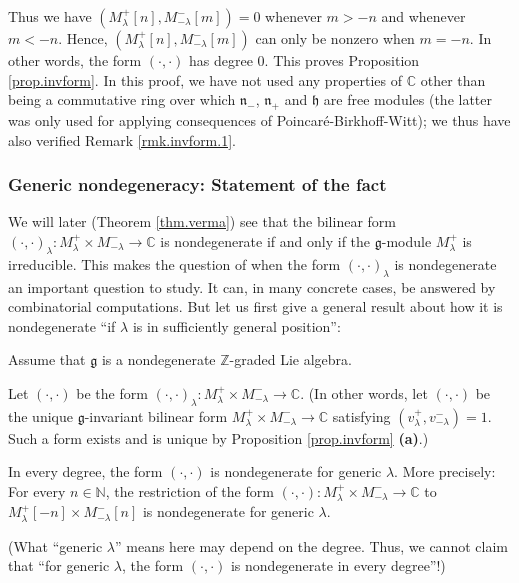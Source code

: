 \documentclass[etingof-lie.tex]{subfiles}
\begin{document}
Thus we have $\left(  M_{\lambda}^{+}\left[  n\right]  ,M_{-\lambda}%
^{-}\left[  m\right]  \right)  =0$ whenever $m>-n$ and whenever $m<-n$. Hence,
$\left(  M_{\lambda}^{+}\left[  n\right]  ,M_{-\lambda}^{-}\left[  m\right]
\right)  $ can only be nonzero when $m=-n$. In other words, the form $\left(
\cdot,\cdot\right)  $ has degree $0$. This proves Proposition
\ref{prop.invform}. In this proof, we have not used any properties of
$\mathbb{C}$ other than being a commutative ring over which $\mathfrak{n}_{-}%
$, $\mathfrak{n}_{+}$ and $\mathfrak{h}$ are free modules (the latter was only
used for applying consequences of Poincar\'{e}-Birkhoff-Witt); we thus have
also verified Remark \ref{rmk.invform.1}.

\subsubsection{Generic nondegeneracy: Statement of the fact}

We will later (Theorem \ref{thm.verma}) see that the bilinear form $\left(
\cdot,\cdot\right)  _{\lambda}:M_{\lambda}^{+}\times M_{-\lambda}%
^{-}\rightarrow\mathbb{C}$ is nondegenerate if and only if the $\mathfrak{g}%
$-module $M_{\lambda}^{+}$ is irreducible. This makes the question of when the
form $\left(  \cdot,\cdot\right)  _{\lambda}$ is nondegenerate an important
question to study. It can, in many concrete cases, be answered by
combinatorial computations. But let us first give a general result about how
it is nondegenerate ``if $\lambda$ is in sufficiently general position'':

\begin{theorem}
\label{thm.invformnondeg}Assume that $\mathfrak{g}$ is a nondegenerate
$\mathbb{Z}$-graded Lie algebra.

Let $\left(  \cdot,\cdot\right)  $ be the form $\left(  \cdot,\cdot\right)
_{\lambda}:M_{\lambda}^{+}\times M_{-\lambda}^{-}\rightarrow\mathbb{C}$. (In
other words, let $\left(  \cdot,\cdot\right)  $ be the unique $\mathfrak{g}%
$-invariant bilinear form $M_{\lambda}^{+}\times M_{-\lambda}^{-}%
\rightarrow\mathbb{C}$ satisfying $\left(  v_{\lambda}^{+},v_{-\lambda}%
^{-}\right)  =1$. Such a form exists and is unique by Proposition
\ref{prop.invform} \textbf{(a)}.)

In every degree, the form $\left(  \cdot,\cdot\right)  $ is nondegenerate for
generic $\lambda$. More precisely: For every $n\in\mathbb{N}$, the restriction
of the form $\left(  \cdot,\cdot\right)  :M_{\lambda}^{+}\times M_{-\lambda
}^{-}\rightarrow\mathbb{C}$ to $M_{\lambda}^{+}\left[  -n\right]  \times
M_{-\lambda}^{-}\left[  n\right]  $ is nondegenerate for generic $\lambda$.

(What ``generic $\lambda$'' means here may depend on the degree. Thus, we
cannot claim that ``for generic $\lambda$, the form $\left(  \cdot
,\cdot\right)  $ is nondegenerate in every degree''!)
\end{theorem}
\end{document}
